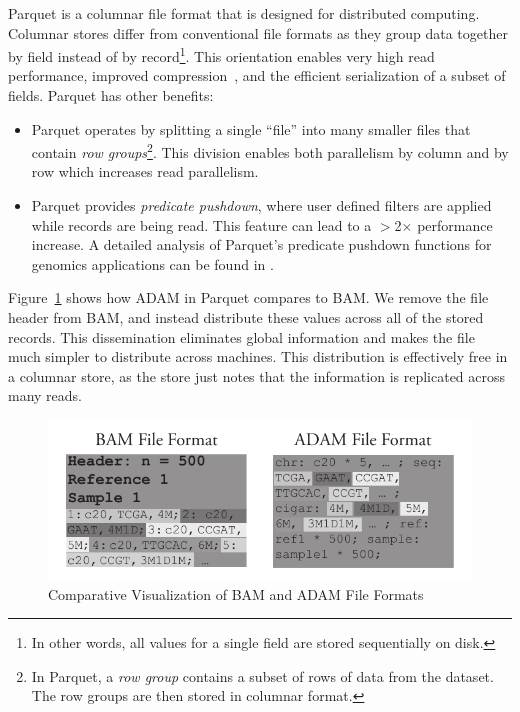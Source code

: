 \documentclass{bioinfo}
\begin{document}
Parquet is a columnar file format that is designed for distributed computing. Columnar stores differ from conventional file formats as they group data together
by field instead of by record\footnote{In other words, all values for a single field are stored sequentially on disk.}. This orientation enables very high read performance, improved
compression~\citep[see][]{abadi06}, and the efficient serialization of a subset of fields. Parquet has other benefits:

\begin{itemize}
\item Parquet operates by splitting a single ``file'' into many smaller files that contain \emph{row groups}\footnote{In Parquet, a \emph{row group} contains a subset
of rows of data from the dataset. The row groups are then stored in columnar format.}. This division enables both parallelism by column and by row which increases read
parallelism.
\item Parquet provides \emph{predicate pushdown}, where user defined filters are applied while records are being read. This feature can lead to a $>$2$\times$ performance increase.
A detailed analysis of Parquet's predicate pushdown functions for genomics applications can be found in \citet{massie13}.
\end{itemize}

Figure~\ref{fig:file-format} shows how ADAM in Parquet compares to BAM. We remove the file header from BAM, and instead distribute these values across all of the stored
records. This dissemination eliminates global information and makes the file much simpler to distribute across machines. This distribution is effectively free in a columnar store,
as the store just notes that the information is replicated across many reads.

\begin{figure}[h]
\begin{center}
\includegraphics[width=\linewidth]{file-format.pdf}
\end{center}
\caption{Comparative Visualization of BAM and ADAM File Formats}
\label{fig:file-format}
\end{figure}
\end{document}
